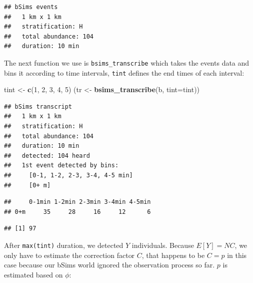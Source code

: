 \documentclass[12pt,]{book}
\newenvironment{Shaded}{\begin{snugshade}}{\end{snugshade}}
\newcommand{\CommentTok}[1]{\textcolor[rgb]{0.56,0.35,0.01}{\textit{#1}}}
\newcommand{\DataTypeTok}[1]{\textcolor[rgb]{0.13,0.29,0.53}{#1}}
\newcommand{\DecValTok}[1]{\textcolor[rgb]{0.00,0.00,0.81}{#1}}
\newcommand{\KeywordTok}[1]{\textcolor[rgb]{0.13,0.29,0.53}{\textbf{#1}}}
\newcommand{\NormalTok}[1]{#1}
\newcommand{\OperatorTok}[1]{\textcolor[rgb]{0.81,0.36,0.00}{\textbf{#1}}}
\newcommand{\StringTok}[1]{\textcolor[rgb]{0.31,0.60,0.02}{#1}}
\begin{document}
\begin{verbatim}
## bSims events
##   1 km x 1 km
##   stratification: H
##   total abundance: 104
##   duration: 10 min
\end{verbatim}

The next function we use is \texttt{bsims\_transcribe} which takes the events data
and bins it according to time intervals, \texttt{tint} defines the end times of
each interval:

\begin{Shaded}
\begin{Highlighting}[]
\NormalTok{tint <-}\StringTok{ }\KeywordTok{c}\NormalTok{(}\DecValTok{1}\NormalTok{, }\DecValTok{2}\NormalTok{, }\DecValTok{3}\NormalTok{, }\DecValTok{4}\NormalTok{, }\DecValTok{5}\NormalTok{)}
\NormalTok{(tr <-}\StringTok{ }\KeywordTok{bsims_transcribe}\NormalTok{(b, }\DataTypeTok{tint=}\NormalTok{tint))}
\end{Highlighting}
\end{Shaded}

\begin{verbatim}
## bSims transcript
##   1 km x 1 km
##   stratification: H
##   total abundance: 104
##   duration: 10 min
##   detected: 104 heard
##   1st event detected by bins:
##     [0-1, 1-2, 2-3, 3-4, 4-5 min]
##     [0+ m]
\end{verbatim}

\begin{Shaded}
\end{Shaded}

\begin{verbatim}
##     0-1min 1-2min 2-3min 3-4min 4-5min
## 0+m     35     28     16     12      6
\end{verbatim}

\begin{Shaded}
\end{Shaded}

\begin{verbatim}
## [1] 97
\end{verbatim}

After \texttt{max(tint)} duration, we detected \(Y\) individuals.
Because \(E[Y] = NC\), we only have to estimate the correction factor \(C\),
that happens to be \(C=p\) in this case because our bSims world
ignored the observation process so far. \(p\) is estimated based on \(\phi\):
\end{document}
